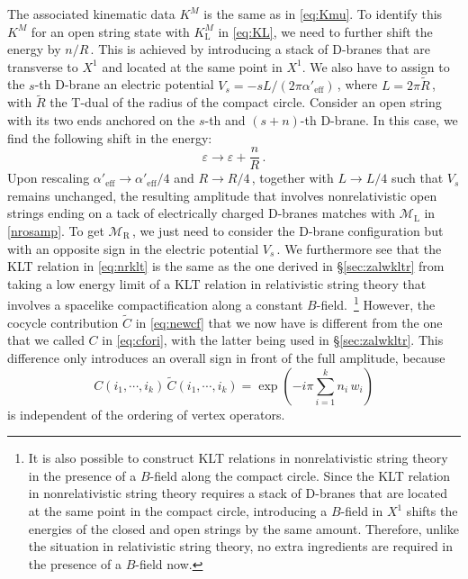 \documentclass[11pt]{article}
\newcommand{\be}{\begin{equation}}
\newcommand{\ee}{\end{equation}}
\newcommand{\CM}{\mathcal{M}}
\newcommand{\lr}{\left (}
\newcommand{\rr}{\right )}
\renewcommand{\tilde}[1]{\widetilde{#1}}
\begin{document}
The associated kinematic data $K^M$ is the  same as in \eqref{eq:Kmu}. To identify this $K^M$ for an open string state with $K^M_\text{L}$ in \eqref{eq:KL}, we need to further shift the energy by $n / R$\,. This is achieved by introducing a stack of D-branes that are transverse to $X^1$ and located at the same point in $X^1$. We also have to assign to the $s$-th D-brane an electric potential $V_s = - s L / (2\pi\alpha'_\text{eff})$\,, where $L = 2 \pi \tilde{R}$\,, with $\tilde{R}$  the T-dual of the radius of the compact circle. Consider an open string with its two ends anchored on the $s$-th and $(s+n)$-th D-brane. In this case, we find the following shift in the energy:
%
\be \label{eq:ees}
    \varepsilon \rightarrow \varepsilon + \frac{n}{R}\,.
\ee
%
Upon rescaling $\alpha'_\text{eff} \rightarrow \alpha'_\text{eff}/4$ and $R \rightarrow R/4$\,, together with $L \rightarrow L / 4$ such that $V_s$ remains unchanged, the resulting amplitude that involves nonrelativistic open strings ending on a tack of electrically charged D-branes matches with $\CM_\text{L}$ in \eqref{nrosamp}. 
To get $\CM_\text{R}$\,, we just need to consider the D-brane configuration but with an opposite sign in the electric potential $V_s$\,. We furthermore see that the KLT relation in \eqref{eq:nrklt} is the same as the one derived in \S\ref{sec:zalwkltr} from taking a low energy limit of a KLT relation in relativistic string theory that involves a spacelike compactification along a constant $B$-field.~\footnote{It is also possible to construct KLT relations in nonrelativistic string theory in the presence of a $B$-field along the compact circle.
Since the KLT relation in nonrelativistic string theory requires a stack of D-branes that are located at the same point in the compact circle, introducing a $B$-field in $X^1$ shifts the energies of the closed and open strings by the same amount. Therefore, unlike the situation in relativistic string theory, no extra ingredients are required in the presence of a $B$-field now.} However, the cocycle contribution $\tilde{C}$ in \eqref{eq:newcf} that we now have is different from the one that we called $C$ in \eqref{eq:cfori}, with the latter being used in \S\ref{sec:zalwkltr}. This difference only introduces an overall sign in front of the full amplitude, because
%
\be \label{eq:ovasgn}
    C (i_1, \cdots, i_k) \, \tilde{C} (i_1, \cdots, i_k) = \exp \! \lr - i\pi \sum_{i=1}^k n_i \, w_i \rr
\ee
%
is independent of the ordering of vertex operators. 




\end{document}

